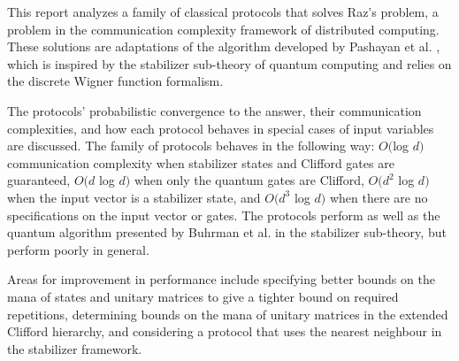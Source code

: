 \documentclass[../3Wworkreport.tex]{subfiles}
\begin{document}
\dotoc

\label{sec:summary}

This report analyzes a family of classical protocols that solves Raz\rq{s} problem, a problem in the communication complexity framework of distributed computing. These solutions are adaptations of the algorithm developed by Pashayan et al. \parencite*{Pashayan2014}, which is inspired by the stabilizer sub-theory of quantum computing and relies on the discrete Wigner function formalism.
 
 The protocols\rq{} probabilistic convergence to the answer, their communication complexities, and how each protocol behaves in special cases of input variables are discussed. The family of protocols behaves in the following way: $O($log $d)$ communication complexity when stabilizer states and Clifford gates are guaranteed, $O(d$ log $d)$ when only the quantum gates are Clifford, $O(d^2$ log $d)$ when the input vector is a stabilizer state, and $O(d^3$ log $d)$ when there are no specifications on the input vector or gates. The protocols perform as well as the quantum algorithm presented by Buhrman et al. \parencite*{Buhrman2009} in the stabilizer sub-theory, but perform poorly in general.
 
Areas for improvement in performance include specifying better bounds on the mana of states and unitary matrices to give a tighter bound on required repetitions, determining bounds on the mana of unitary matrices in the extended Clifford hierarchy, and considering a protocol that uses the nearest neighbour in the stabilizer framework.
\newpage
\end{document}
